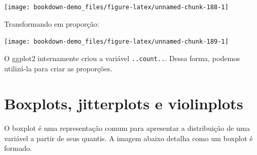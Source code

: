 \documentclass[]{book}
\newenvironment{Shaded}{\begin{snugshade}}{\end{snugshade}}
\newcommand{\KeywordTok}[1]{\textcolor[rgb]{0.13,0.29,0.53}{\textbf{#1}}}
\newcommand{\DataTypeTok}[1]{\textcolor[rgb]{0.13,0.29,0.53}{#1}}
\newcommand{\DecValTok}[1]{\textcolor[rgb]{0.00,0.00,0.81}{#1}}
\newcommand{\StringTok}[1]{\textcolor[rgb]{0.31,0.60,0.02}{#1}}
\newcommand{\OperatorTok}[1]{\textcolor[rgb]{0.81,0.36,0.00}{\textbf{#1}}}
\newcommand{\NormalTok}[1]{#1}
\begin{document}
\begin{center}\texttt{[image: bookdown-demo\_files/figure-latex/unnamed-chunk-188-1]} \end{center}

Transformando em proporção:

\begin{Shaded}
\end{Shaded}

\begin{center}\texttt{[image: bookdown-demo\_files/figure-latex/unnamed-chunk-189-1]} \end{center}

O ggplot2 internamente criou a variável \texttt{..count..}. Dessa forma,
podemos utilizá-la para criar as proporções.

\section{Boxplots, jitterplots e
violinplots}\label{boxplots-jitterplots-e-violinplots}

O boxplot é uma representação comum para apresentar a distribuição de
uma variável a partir de seus quantis. A imagem abaixo detalha como um
boxplot é formado.
\end{document}
